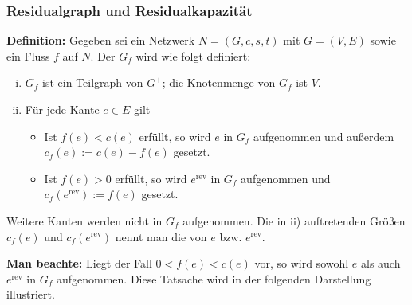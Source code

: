 \documentclass[smaller]{beamer}
\begin{document}
\begin{frame}
 \frametitle{Residualgraph und Residualkapazität}
 \textbf{Definition:} Gegeben sei ein Netzwerk $N=(G,c,s,t)$ mit $G=(V,E)$ sowie ein Fluss $f$ auf $N$. Der  $G_f$ wird wie folgt definiert:
	\begin{enumerate}[i)]
		\item $G_f$ ist ein Teilgraph von $G^+$; die Knotenmenge von $G_f$ ist $V$.
		
		\item Für jede Kante $e \in E$ gilt
		\begin{itemize}
			\item Ist $f(e) < c(e)$ erfüllt, so wird $e$ in $G_f$ aufgenommen und außerdem $c_f(e) := c(e)-f(e)$ gesetzt.
			
			\item Ist $f(e) > 0$ erfüllt, so wird $e^{\text{rev}}$ in $G_f$ aufgenommen und $c_f(e^{\text{rev}}) := f(e)$ gesetzt.
		\end{itemize}
	\end{enumerate}

	Weitere Kanten werden nicht in $G_f$ aufgenommen. Die in ii) auftretenden Größen $c_f(e)$ und $c_f(e^{\text{rev}})$ nennt man die  von $e$ bzw. $e^{\text{rev}}$. \\ \vspace*{0.2cm}

\textbf{Man beachte:} Liegt der Fall $0 < f(e) < c(e)$ vor, so wird sowohl $e$ als auch $e^\text{rev}$ in $G_f$ aufgenommen. Diese Tatsache wird in der folgenden Darstellung illustriert.
\end{frame}
\end{document}
